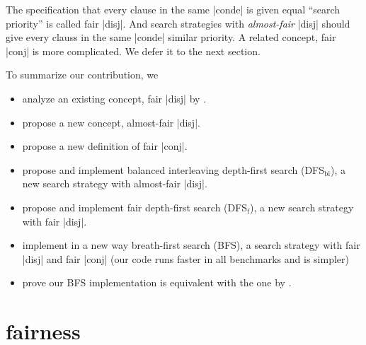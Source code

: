 \documentclass[format=acmlarge, review=true, authordraft=true]{acmart}
\begin{document}
The specification that every clause in the same \scheme|conde| is given equal 
``search priority'' is called fair \scheme|disj|. And search strategies with 
\emph{almost-fair} \scheme|disj| should give every clauss in the same 
\scheme|conde| similar priority. A related concept, fair \scheme|conj| is more 
complicated. We defer it to the next section.

To summarize our contribution, we
\begin{itemize}
    \item analyze an existing concept, fair \scheme|disj| by 
\citet{seres1999algebra}.
	\item propose a new concept, almost-fair \scheme|disj|.
	\item propose a new definition of fair \scheme|conj|.
	\item propose and implement balanced interleaving depth-first search 
	(DFS$_\textrm{bi}$), a new search strategy with almost-fair \scheme|disj|.
	\item propose and implement fair depth-first search (DFS$_\textrm{f}$), a 
	new search strategy with fair \scheme|disj|.
	\item implement in a new way breath-first search (BFS), a search strategy 
	with fair \scheme|disj| and fair \scheme|conj|
	(our code runs faster in all benchmarks and is simpler)
	\item prove our BFS implementation is equivalent with the one by 
	\citet{seres1999algebra}.
\end{itemize}


 

\section{fairness}
\end{document}
